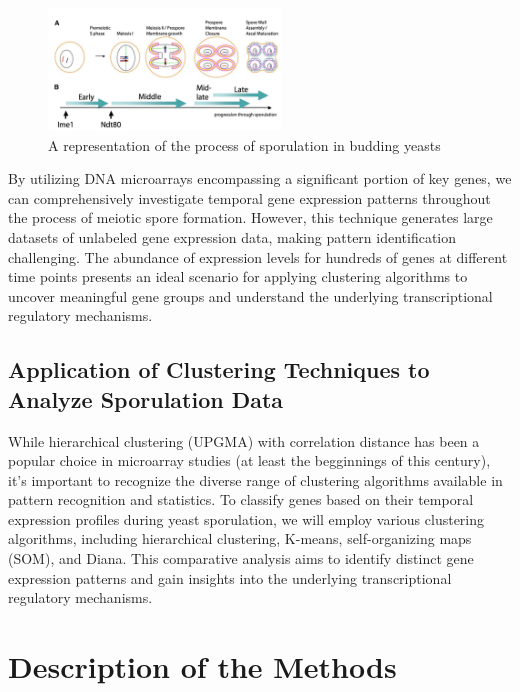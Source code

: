 \documentclass{llncs}
\begin{document}
\begin{figure}[h!]
	\begin{center}  %
		\includegraphics[width=0.55\textwidth]{images/sporlutation.png}
		\caption{A representation of the process of sporulation in budding yeasts}
		\label{fig:Sporlutation}
	\end{center}
\end{figure}


By utilizing DNA microarrays encompassing a significant portion of key genes, we can comprehensively investigate temporal gene expression patterns throughout the process of meiotic spore formation. However, this technique generates large datasets of unlabeled gene expression data, making pattern identification challenging. The abundance of expression levels for hundreds of genes at different time points presents an ideal scenario for applying clustering algorithms to uncover meaningful gene groups and understand the underlying transcriptional regulatory mechanisms.\cite{datta2003}

\subsection*{Application of Clustering Techniques to Analyze Sporulation Data}

While hierarchical clustering (UPGMA) with correlation distance has been a popular choice in microarray studies (at least the begginnings of this century), it's important to recognize the diverse range of clustering algorithms available in pattern recognition and statistics. To classify genes based on their temporal expression profiles during yeast sporulation, we will employ various clustering algorithms, including hierarchical clustering, K-means, self-organizing maps (SOM), and Diana. This comparative analysis aims to identify distinct gene expression patterns and gain insights into the underlying transcriptional regulatory mechanisms.\cite{datta2003}



\section{Description of the Methods}
\end{document}
